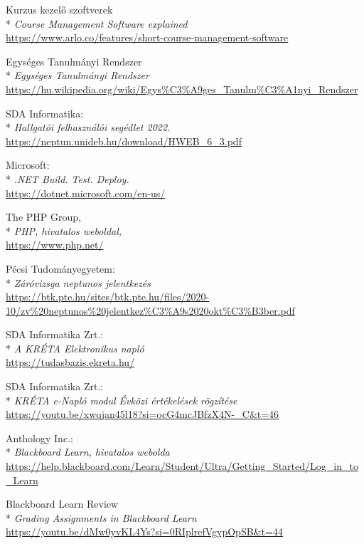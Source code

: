 \begin{thebibliography}{x}

 Kurzus kezelő szoftverek\\*
\textit{Course Management Software explained}
\\ \url{https://www.arlo.co/features/short-course-management-software}

 Egységes Tanulmányi Rendszer\\*
\textit{Egységes Tanulmányi Rendszer}
\\ \url{https://hu.wikipedia.org/wiki/Egys%C3%A9ges_Tanulm%C3%A1nyi_Rendszer}

 SDA Informatika:\\*
\textit{Hallgatói felhasználói segédlet 2022.}
\\ \url{https://neptun.unideb.hu/download/HWEB_6_3.pdf}

 Microsoft:\\*
\textit{.NET Build. Test. Deploy.}
\\ \url{https://dotnet.microsoft.com/en-us/}

 The PHP Group,\\*
\textit{PHP, hivatalos weboldal,}
\\ \url{https://www.php.net/}

 Pécsi Tudományegyetem:\\*
\textit{Záróvizsga neptunos jelentkezés}
\\ \url{https://btk.pte.hu/sites/btk.pte.hu/files/2020-10/zv%20neptunos%20jelentkez%C3%A9s2020okt%C3%B3ber.pdf}

 SDA Informatika Zrt.:\\*
\textit{A KRÉTA Elektronikus napló}
\\ \url{https://tudasbazis.ekreta.hu/}

 SDA Informatika Zrt.:\\*
\textit{KRÉTA e-Napló modul Évközi értékelések rögzítése}
\\ \url{https://youtu.be/xwqjan45l18?si=ocG4mcJBfzX4N-_C&t=46}

 Anthology Inc.:\\*
\textit{Blackboard Learn, hivatalos webolda}
\\ \url{https://help.blackboard.com/Learn/Student/Ultra/Getting_Started/Log_in_to_Learn}

 Blackboard Learn Review\\*
\textit{Grading Assignments in Blackboard Learn}
\\ \url{https://youtu.be/dMw0yvKL4Ys?si=0RIplrefVgypOpSB&t=44}


\end{thebibliography}
